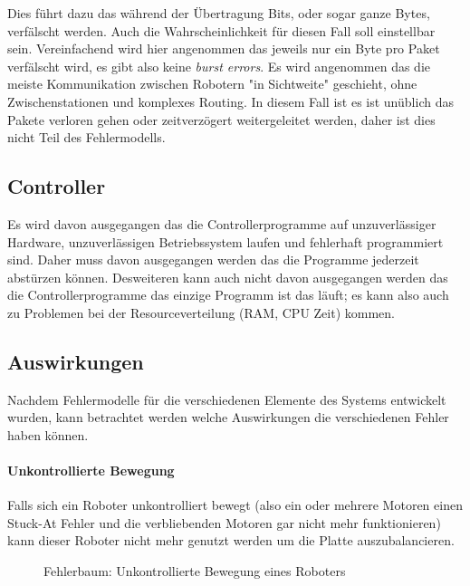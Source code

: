 Dies f{\"{u}}hrt dazu das w{\"{a}}hrend der {\"{U}}bertragung Bits, oder sogar ganze Bytes, verf{\"{a}}lscht werden. Auch die Wahrscheinlichkeit f{\"{u}}r diesen Fall
soll einstellbar sein. Vereinfachend wird hier angenommen das jeweils nur ein Byte pro Paket verf{\"{a}}lscht wird, es gibt also keine \textit{burst errors}.
Es wird angenommen das die meiste Kommunikation zwischen Robotern "in Sichtweite" geschieht, ohne Zwischenstationen und komplexes Routing. In diesem Fall ist
es ist un{\"{u}}blich das Pakete verloren gehen oder zeitverz{\"{o}}gert weitergeleitet werden, daher ist dies nicht Teil des Fehlermodells.

\subsection{Controller}
Es wird davon ausgegangen das die Controllerprogramme auf unzuverl{\"{a}}ssiger Hardware, unzuverl{\"{a}}ssigen Betriebssystem laufen und fehlerhaft programmiert sind.
Daher muss davon ausgegangen werden das die Programme jederzeit abst{\"{u}}rzen k{\"{o}}nnen. Desweiteren kann auch nicht davon ausgegangen werden das die
Controllerprogramme das einzige Programm ist das l{\"{a}}uft; es kann also auch zu Problemen bei der Resourceverteilung (RAM, CPU Zeit) kommen.

\subsection{Auswirkungen}
Nachdem Fehlermodelle f{\"{u}}r die verschiedenen Elemente des Systems entwickelt wurden, kann betrachtet werden welche Auswirkungen die verschiedenen Fehler haben
k{\"{o}}nnen.

\paragraph{Unkontrollierte Bewegung} Falls sich ein Roboter unkontrolliert bewegt (also ein oder mehrere Motoren einen Stuck-At Fehler und die
verbliebenden Motoren gar nicht mehr funktionieren) kann dieser Roboter nicht mehr genutzt werden um die Platte auszubalancieren.
\begin{figure}
	\centering
	\caption{Fehlerbaum: Unkontrollierte Bewegung eines Roboters}
	\label{fig:fault-tree-robot}
\end{figure}
\clearpage

